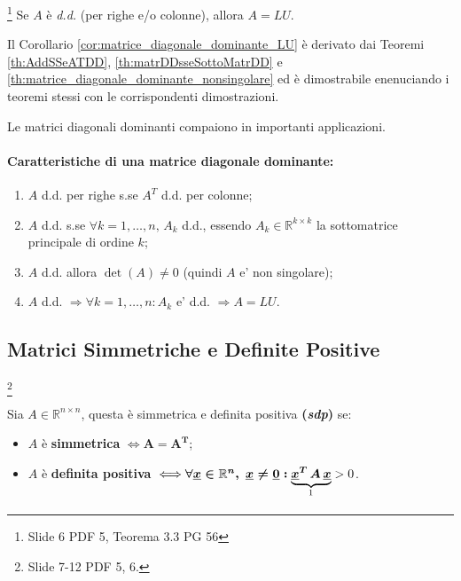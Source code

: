 \addtocounter{footnote}{-1}


\begin{corollary}\label{cor:matrice_diagonale_dominante_LU}\footnote{Slide 6 PDF 5, Teorema 3.3 PG 56}
    Se $A$ è \textit{d.d.} (per righe e/o colonne), allora $A=LU$.
\end{corollary}

Il Corollario \ref{cor:matrice_diagonale_dominante_LU} è derivato dai Teoremi \ref{th:AddSSeATDD}, \ref{th:matrDDsseSottoMatrDD} e \ref{th:matrice_diagonale_dominante_nonsingolare} ed è dimostrabile enenuciando i teoremi stessi con le corrispondenti dimostrazioni.

\begin{remark}
    Le matrici diagonali dominanti compaiono in importanti applicazioni.
\end{remark}

\paragraph{Caratteristiche di una matrice diagonale dominante:}
\begin{enumerate}
	\item $A$ d.d. per righe s.se $A^T$ d.d. per colonne;
	\item $A$ d.d. s.se $\forall k=1,\hdots, n,\, A_k$ d.d., essendo $A_k\in\mathbb{R}^{k\times k}$ la sottomatrice principale di ordine $k$;
	\item $A$ d.d. allora $\det(A)\neq 0$ (quindi $A$ e' non singolare);
	\item $A$ d.d. $\Rightarrow\forall k=1,\hdots,n\colon A_k$ e' d.d. $\Rightarrow A=LU$.
\end{enumerate}

\subsection{Matrici Simmetriche e Definite Positive}\label{ssec:matrSDPFattLDL}\footnote{Slide 7-12 PDF 5, 6.}
\begin{definition}
    Sia $A\in\mathbb R^{n\times n}$, questa è simmetrica e definita positiva \textbf{(\textit{sdp})} se:
    \begin{itemize}
        \item $A$ è \textbf{simmetrica} $\iff \boldsymbol{A=A^T}$;
        \item $A$ è \textbf{definita positiva} $\iff\boldsymbol{\forall\uline x\in\mathbb R^n,\; \uline x\neq \uline 0:} \underbrace{\boldsymbol{\uline x^T\, A\, \uline x}}_{\footnotemark}>0$.
    \end{itemize}
\end{definition}

